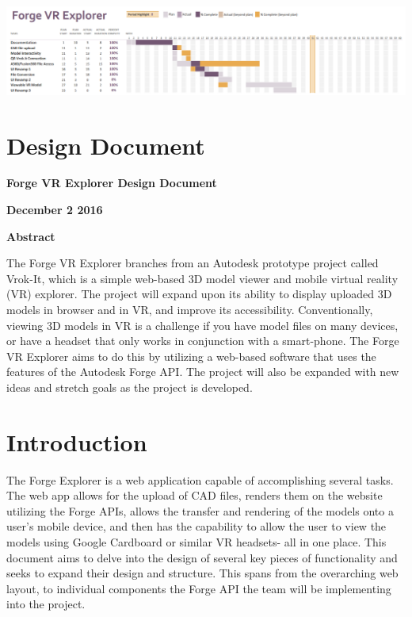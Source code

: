 \documentclass[letterpaper, 10pt, draftclsnofoot, compsoc, onecolumn]{IEEEtran}
\begin{document}
\begin{center}
	\includegraphics[scale=0.8]{NewGantt.png}
\end{center}


\newpage
\section{Design Document}
\thispagestyle{FirstPage}

\bigskip

{\centering{}\bfseries\color{black}
Forge VR Explorer Design Document
\par}

\bigskip

{\centering{}\bfseries\color{black}
December 2 2016
\par}
\bigskip
\bigskip
\bigskip
\bigskip
\bigskip
\bigskip
\bigskip
\bigskip
\bigskip
\bigskip
\bigskip
\bigskip

\vfill
{\centering{}\bfseries\color{black}
Abstract
\par}

{\centering{}\mdseries\color{black}
	The Forge VR Explorer branches from an Autodesk prototype project called Vrok-It, which is a simple web-based 3D 
	model viewer and mobile virtual reality (VR) explorer. The project will expand upon its ability to display uploaded 3D 
	models in browser and in VR, and improve its accessibility. Conventionally, viewing 3D models in VR is a challenge if 
	you have model files on many devices, or have a headset that only works in conjunction with a smart-phone. The 
	Forge VR Explorer aims to do this by utilizing a web-based software that uses the features of the Autodesk Forge API. 
	The project will also be expanded with new ideas and stretch goals as the project is developed.
\par}
\clearpage

\section{Introduction}
The Forge Explorer is a web application capable of accomplishing several tasks. The web app allows for the upload of CAD files, renders them on the website utilizing the Forge APIs, allows the transfer and rendering of the models onto a user's mobile device, and then has the capability to allow the user to view the models using Google Cardboard or similar VR headsets- all in one place. This document aims to delve into the design of several key pieces of functionality and seeks to expand their design and structure. This spans from the overarching web layout, to individual components the Forge API the team will be implementing into the project.
\end{document}
